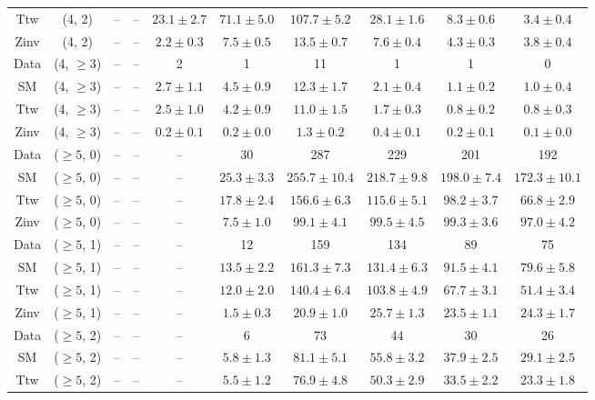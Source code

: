 \begin{table}[h!]
{\begin{tabular}{cccccccccc}
	Ttw & (4, 2) & -- & -- & $23.1\pm 2.7$ & $71.1\pm 5.0$ & $107.7\pm 5.2$ & $28.1\pm 1.6$ & $8.3\pm 0.6$ & $3.4\pm 0.4$ \\[0.5ex] 
	Zinv & (4, 2) & -- & -- & $2.2\pm 0.3$ & $7.5\pm 0.5$ & $13.5\pm 0.7$ & $7.6\pm 0.4$ & $4.3\pm 0.3$ & $3.8\pm 0.4$ \\[0.5ex] 
	Data & (4, $\ge3$) & -- & -- & 2 & 1 & 11 & 1 & 1 & 0 \\[0.5ex] 
	SM & (4, $\ge3$) & -- & -- & $2.7\pm 1.1$ & $4.5\pm 0.9$ & $12.3\pm 1.7$ & $2.1\pm 0.4$ & $1.1\pm 0.2$ & $1.0\pm 0.4$ \\[0.5ex] 
	Ttw & (4, $\ge3$) & -- & -- & $2.5\pm 1.0$ & $4.2\pm 0.9$ & $11.0\pm 1.5$ & $1.7\pm 0.3$ & $0.8\pm 0.2$ & $0.8\pm 0.3$ \\[0.5ex] 
	Zinv & (4, $\ge3$) & -- & -- & $0.2\pm 0.1$ & $0.2\pm 0.0$ & $1.3\pm 0.2$ & $0.4\pm 0.1$ & $0.2\pm 0.1$ & $0.1\pm 0.0$ \\[0.5ex] 
	Data & ($\ge5$, 0) & -- & -- & -- & 30 & 287 & 229 & 201 & 192 \\[0.5ex] 
	SM & ($\ge5$, 0) & -- & -- & -- & $25.3\pm 3.3$ & $255.7\pm 10.4$ & $218.7\pm 9.8$ & $198.0\pm 7.4$ & $172.3\pm 10.1$ \\[0.5ex] 
	Ttw & ($\ge5$, 0) & -- & -- & -- & $17.8\pm 2.4$ & $156.6\pm 6.3$ & $115.6\pm 5.1$ & $98.2\pm 3.7$ & $66.8\pm 2.9$ \\[0.5ex] 
	Zinv & ($\ge5$, 0) & -- & -- & -- & $7.5\pm 1.0$ & $99.1\pm 4.1$ & $99.5\pm 4.5$ & $99.3\pm 3.6$ & $97.0\pm 4.2$ \\[0.5ex] 
	Data & ($\ge5$, 1) & -- & -- & -- & 12 & 159 & 134 & 89 & 75 \\[0.5ex] 
	SM & ($\ge5$, 1) & -- & -- & -- & $13.5\pm 2.2$ & $161.3\pm 7.3$ & $131.4\pm 6.3$ & $91.5\pm 4.1$ & $79.6\pm 5.8$ \\[0.5ex] 
	Ttw & ($\ge5$, 1) & -- & -- & -- & $12.0\pm 2.0$ & $140.4\pm 6.4$ & $103.8\pm 4.9$ & $67.7\pm 3.1$ & $51.4\pm 3.4$ \\[0.5ex] 
	Zinv & ($\ge5$, 1) & -- & -- & -- & $1.5\pm 0.3$ & $20.9\pm 1.0$ & $25.7\pm 1.3$ & $23.5\pm 1.1$ & $24.3\pm 1.7$ \\[0.5ex] 
	Data & ($\ge5$, 2) & -- & -- & -- & 6 & 73 & 44 & 30 & 26 \\[0.5ex] 
	SM & ($\ge5$, 2) & -- & -- & -- & $5.8\pm 1.3$ & $81.1\pm 5.1$ & $55.8\pm 3.2$ & $37.9\pm 2.5$ & $29.1\pm 2.5$ \\[0.5ex] 
	Ttw & ($\ge5$, 2) & -- & -- & -- & $5.5\pm 1.2$ & $76.9\pm 4.8$ & $50.3\pm 2.9$ & $33.5\pm 2.2$ & $23.3\pm 1.8$ \\[0.5ex] 

\end{tabular}}
\end{table}
